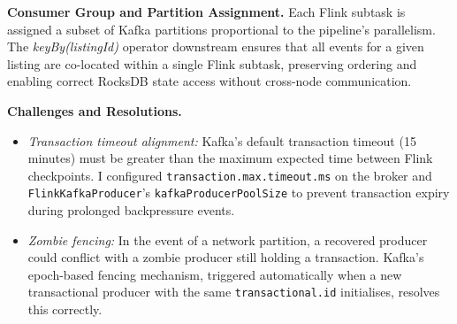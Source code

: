 \begin{justify}
    \textbf{Consumer Group and Partition Assignment.} Each Flink subtask is assigned a subset of Kafka partitions proportional to the pipeline's parallelism. The \textit{keyBy(listingId)} operator downstream ensures that all events for a given listing are co-located within a single Flink subtask, preserving ordering and enabling correct RocksDB state access without cross-node communication.

    \textbf{Challenges and Resolutions.}
    \begin{itemize}
        \item \textit{Transaction timeout alignment:} Kafka's default transaction timeout (15 minutes) must be greater than the maximum expected time between Flink checkpoints. I configured \texttt{transaction.max.timeout.ms} on the broker and \texttt{FlinkKafkaProducer}'s \texttt{kafkaProducerPoolSize} to prevent transaction expiry during prolonged backpressure events.
        \item \textit{Zombie fencing:} In the event of a network partition, a recovered producer could conflict with a zombie producer still holding a transaction. Kafka's epoch-based fencing mechanism, triggered automatically when a new transactional producer with the same \texttt{transactional.id} initialises, resolves this correctly.
    \end{itemize}
\end{justify}

